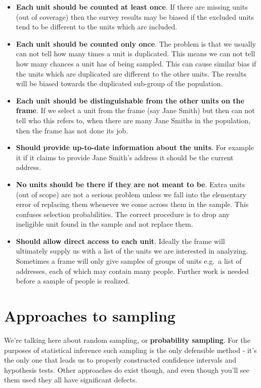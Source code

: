 \documentclass[
]{book}
\begin{document}
\begin{itemize}
\item
  \textbf{Each unit should be counted at least once}. If there are missing
  units (out of coverage) then the survey results may be biased if the excluded
  units tend to be different to the units which are included.
\item
  \textbf{Each unit should be counted only once}. The problem is that we
  usually can not tell how many times a unit is duplicated. This means we can
  not tell how many chances a unit has of being sampled. This can cause
  similar bias if the units which are duplicated are different to the other
  units. The results will be biased towards the duplicated sub-group of the
  population.
\item
  \textbf{Each unit should be distinguishable from the other units on the
  frame}. If we select a unit from the frame (say Jane Smith) but then can
  not tell who this refers to, when there are many Jane Smiths in the
  population, then the frame has not done its job.
\item
  \textbf{Should provide up-to-date information about the units}. For example
  it if it claims to provide Jane Smith's address it should be the current
  address.
\item
  \textbf{No units should be there if they are not meant to be}. Extra units
  (out of scope) are not a serious problem unless we fall into the elementary
  error of replacing them whenever we come across them in the sample. This
  confuses selection probabilities. The correct procedure is to drop any
  ineligible unit found in the sample and not replace them.
\item
  \textbf{Should allow direct access to each unit}. Ideally the frame will
  ultimately supply us with a list of the units we are interested in analyzing.
  Sometimes a frame will only give samples of groups of units e.g.~a list of
  addresses, each of which may contain many people. Further work is needed
  before a sample of people is realized.
\end{itemize}

\section{Approaches to sampling}\label{approaches-to-sampling}

We're talking here about random sampling, or \textbf{probability sampling}. For
the purposes of statistical inference such sampling is the only defensible method -
it's the only one that leads us to properly constructed confidence intervals
and hypothesis tests. Other approaches do exist though, and even though you'll see
them used they all have significant defects.
\end{document}
